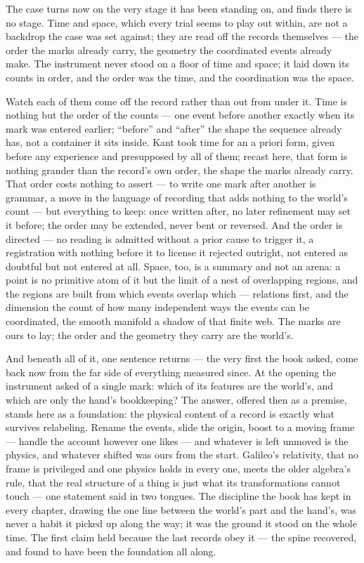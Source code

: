 \noindent The case turns now on the very stage it has been standing on, and finds there is no stage. Time and
space, which every trial seems to play out within, are not a backdrop the case was set against; they are read
off the records themselves --- the order the marks already carry, the geometry the coordinated events already
make. The instrument never stood on a floor of time and space; it laid down its counts in order, and the order
was the time, and the coordination was the space.

Watch each of them come off the record rather than out from under it. Time is nothing but the order of the
counts --- one event before another exactly when its mark was entered earlier; ``before'' and ``after'' the
shape the sequence already has, not a container it sits inside. Kant took time for an a priori form, given
before any experience and presupposed by all of them; recast here, that form is nothing grander than the
record's own order, the shape the marks already carry. That order costs nothing to assert --- to write
one mark after another is grammar, a move in the language of recording that adds nothing to the world's count
--- but everything to keep: once written after, no later refinement may set it before; the order may be
extended, never bent or reversed. And the order is directed --- no reading is admitted without a prior cause to
trigger it, a registration with nothing before it to license it rejected outright, not entered as doubtful but
not entered at all. Space, too, is a summary and not an arena: a point is no primitive atom of it but the limit of a nest of
overlapping regions, and the regions are built from which events overlap which --- relations first, and the
dimension the count of how many independent ways the events can be coordinated, the smooth manifold a shadow of
that finite web. The marks are ours to lay; the
order and the geometry they carry are the world's.

And beneath all of it, one sentence returns --- the very first the book asked, come back now from the far side
of everything measured since. At the opening the instrument asked of a single mark: which of its features are
the world's, and which are only the hand's bookkeeping? The answer, offered then as a premise, stands here as a
foundation: the physical content of a record is exactly what survives relabeling. Rename the events, slide the
origin, boost to a moving frame --- handle the account however one likes --- and whatever is left unmoved is the
physics, and whatever shifted was ours from the start. Galileo's relativity, that no frame is privileged and
one physics holds in every one, meets the older algebra's rule, that the real structure of a thing is just what
its transformations cannot touch --- one statement said in two tongues. The discipline the book has kept in every chapter, drawing
the one line between the world's part and the hand's, was never a habit it picked up along the way; it was the
ground it stood on the whole time. The first claim held because the last records obey it --- the spine
recovered, and found to have been the foundation all along.

